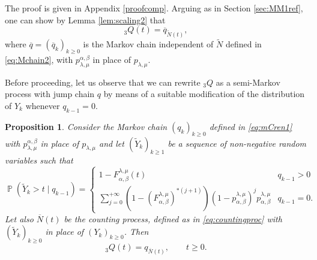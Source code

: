 \documentclass[]{amsart}
\numberwithin{equation}{section}
\newtheorem{prop}[thm]{Proposition}
\theoremstyle{remark}
\theoremstyle{definition}
\DeclareMathOperator{\bP}{\mathbb{P}}
\begin{document}
{The proof is given in Appendix \ref{proofcomp}.}
{
Arguing as in Section \ref{sec:MM1ref}, one can show by Lemma \ref{lem:scaling2} that 
		\begin{equation*}
			{}_3{Q}(t)=\overline{q}_{\widetilde{N}(t)},
		\end{equation*}
		where $\overline{q}=(\overline{q}_k)_{k \ge 0}$ is the Markov chain independent of $\widetilde{N}$ defined in \eqref{eq:Mchain2}, with $p_{\lambda,\mu}^{\alpha,\beta}$ in place of $p_{\lambda,\mu}$.
}

{Before proceeding, let us observe that we can rewrite ${}_3Q$ as a semi-Markov process with jump chain $q$ by means of a suitable modification of the distribution of $Y_k$ whenever $q_{k-1}=0$.}
\begin{prop}\label{prop:27}
	Consider the Markov chain $(q_k)_{k \ge 0}$ defined in \eqref{eq:mCren1} with $p_{\lambda,\mu}^{\alpha,\beta}$ in place of $p_{\lambda,\mu}$ and let $(\widetilde{Y}_k)_{k \ge 1}$ be a sequence of non-negative random variables such that
	\begin{equation}\label{eq:tildeY}
		\bP(\widetilde{Y}_k>t \mid q_{k-1})=\begin{cases}
			1-F_{\alpha,\beta}^{\lambda,\mu}(t) & q_{k-1}>0 \\
			\sum_{j=0}^{+\infty}(1-(F_{\alpha,\beta}^{\lambda,\mu})^{\ast(j+1)})(1-p_{\alpha,\beta}^{\lambda,\mu})^jp_{\alpha,\beta}^{\lambda,\mu} & q_{k-1}=0.
		\end{cases}
	\end{equation}
	Let also $\overline{N}(t)$ be the counting process, defined as in \eqref{eq:countingproc} with $(\widetilde{Y}_k)_{k \ge 0}$ in place of $(Y_k)_{k \ge 0}$. Then 
	\begin{equation*}
		{}_3Q(t)=q_{\overline{N}(t)}, \qquad t \ge 0.
	\end{equation*}
\end{prop}
\end{document}
